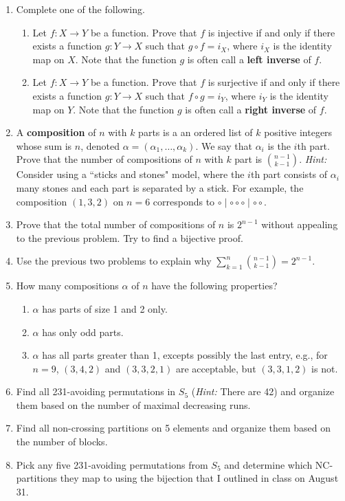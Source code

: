 \documentclass[11pt]{article}%
\theoremstyle{definition}
\begin{document}
\begin{enumerate}

\item Complete one of the following.
\begin{enumerate}
\item Let $f:X\to Y$ be a function.  Prove that $f$ is injective if and only if there exists a function $g:Y\to X$ such that $g\circ f=i_X$, where $i_X$ is the identity map on $X$. Note that the function $g$ is often call a \textbf{left inverse} of $f$.
\item Let $f:X\to Y$ be a function.  Prove that $f$ is surjective if and only if there exists a function $g:Y\to X$ such that $f\circ g=i_Y$, where $i_Y$ is the identity map on $Y$. Note that the function $g$ is often call a \textbf{right inverse} of $f$.
\end{enumerate}
\item A \textbf{composition} of $n$ with $k$ parts is a an ordered list of $k$ positive integers whose sum is $n$, denoted $\alpha=(\alpha_1,\ldots,\alpha_k)$.  We say that $\alpha_i$ is the $i$th part.  Prove that the number of compositions of $n$ with $k$ part is $\binom{n-1}{k-1}$.  \emph{Hint:} Consider using a ``sticks and stones" model, where the $i$th part consists of $\alpha_i$ many stones and each part is separated by a stick. For example, the composition $(1,3,2)$ on $n=6$ corresponds to $\circ \mid \circ \circ \circ \mid \circ \circ$.
\item Prove that the total number of compositions of $n$ is $2^{n-1}$ without appealing to the previous problem. Try to find a bijective proof.
\item Use the previous two problems to explain why $\sum_{k=1}^n\binom{n-1}{k-1}=2^{n-1}$.
\item\label{nugget} How many compositions $\alpha$ of $n$ have the following properties?
\begin{enumerate}
\item $\alpha$ has parts of size 1 and 2 only.
\item $\alpha$ has only odd parts.
\item $\alpha$ has all parts greater than 1, excepts possibly the last entry, e.g., for $n=9$, $(3,4,2)$ and $(3,3,2,1)$ are acceptable, but $(3,3,1,2)$ is not.
\end{enumerate}
\item Find all 231-avoiding permutations in $S_5$ (\emph{Hint:} There are 42) and organize them based on the number of maximal decreasing runs.
\item Find all non-crossing partitions on 5 elements and organize them based on the number of blocks.
\item Pick any five 231-avoiding permutations from $S_5$ and determine which NC-partitions they map to using the bijection that I outlined in class on August 31.
\end{enumerate}
\end{document}
